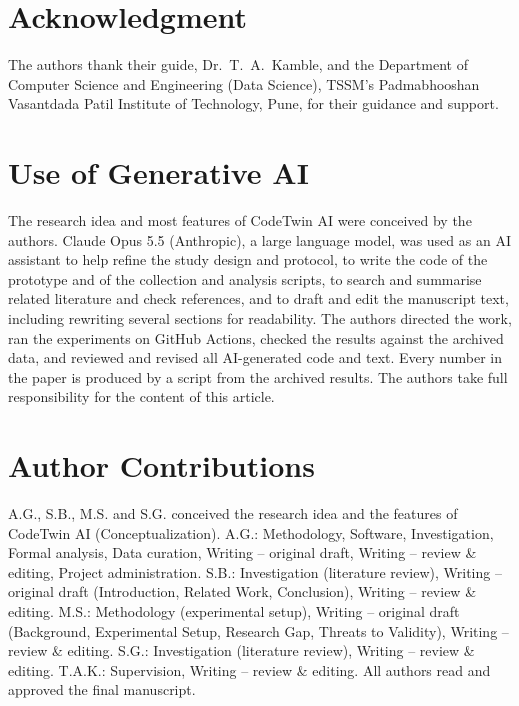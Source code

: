 \documentclass[conference]{IEEEtran}
\begin{document}
\section*{Acknowledgment}
The authors thank their guide, Dr.\ T.~A.\ Kamble, and the Department of Computer Science and Engineering (Data Science), TSSM's Padmabhooshan Vasantdada Patil Institute of Technology, Pune, for their guidance and support.
\section*{Use of Generative AI}
The research idea and most features of CodeTwin AI were conceived by the authors. Claude Opus 5.5 (Anthropic), a large language model, was used as an AI assistant to help refine the study design and protocol, to write the code of the prototype and of the collection and analysis scripts, to search and summarise related literature and check references, and to draft and edit the manuscript text, including rewriting several sections for readability. The authors directed the work, ran the experiments on GitHub Actions, checked the results against the archived data, and reviewed and revised all AI-generated code and text. Every number in the paper is produced by a script from the archived results. The authors take full responsibility for the content of this article.

\section*{Author Contributions}
A.G., S.B., M.S. and S.G. conceived the research idea and the features of CodeTwin AI (Conceptualization). A.G.: Methodology, Software, Investigation, Formal analysis, Data curation, Writing -- original draft, Writing -- review \& editing, Project administration. S.B.: Investigation (literature review), Writing -- original draft (Introduction, Related Work, Conclusion), Writing -- review \& editing. M.S.: Methodology (experimental setup), Writing -- original draft (Background, Experimental Setup, Research Gap, Threats to Validity), Writing -- review \& editing. S.G.: Investigation (literature review), Writing -- review \& editing. T.A.K.: Supervision, Writing -- review \& editing. All authors read and approved the final manuscript.

\balance


\end{document}
